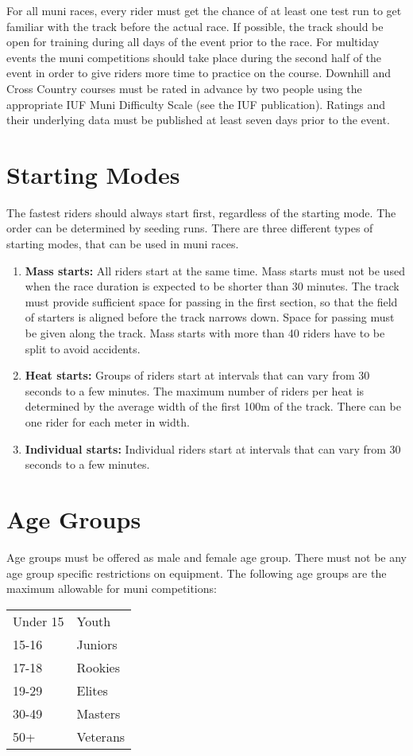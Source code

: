 For all muni races, every rider must get the chance of at least one test run to get familiar with the track before the actual race.
If possible, the track should be open for training during all days of the event prior to the race.
For multiday events the muni competitions should take place during the second half of the event in order to give riders more time to practice on the course.
Downhill and Cross Country courses must be rated in advance by two people using the appropriate IUF Muni Difficulty Scale (see the IUF publication).
Ratings and their underlying data must be published at least seven days prior to the event.

\section{Starting Modes}
The fastest riders should always start first, regardless of the starting mode.
The order can be determined by seeding runs.
There are three different types of starting modes, that can be used in muni races.
\begin{enumerate}
\item \textbf{Mass starts:} All riders start at the same time.
Mass starts must not be used when the race duration is expected to be shorter than 30 minutes.
The track must provide sufficient space for passing in the first section, so that the field of starters is aligned before the track narrows down.
Space for passing must be given along the track.
Mass starts with more than 40 riders have to be split to avoid accidents.
\item \textbf{Heat starts:} Groups of riders start at intervals that can vary from 30 seconds to a few minutes.
The maximum number of riders per heat is determined by the average width of the first 100m of the track.
There can be one rider for each meter in width.
\item \textbf{Individual starts:} Individual riders start at intervals that can vary from 30 seconds to a few minutes.
\end{enumerate}

\section{Age Groups}
Age groups must be offered as male and female age group.
There must not be any age group specific restrictions on equipment.
The following age groups are the maximum allowable for muni competitions:

\begin{tabular}{ l l}
Under 15 & Youth \\
15-16 & Juniors \\
17-18 & Rookies \\
19-29 & Elites \\
30-49 & Masters \\
50+ & Veterans \\
\end{tabular}

